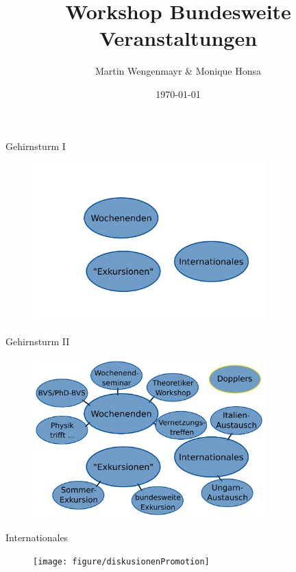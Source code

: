 \documentclass[
]{beamer}
\title[Bundesweites]{Workshop Bundesweite Veranstaltungen}
\author[Martin & Monique]{Martin Wengenmayr & Monique Honsa}
\date{\today}
\institute[]{A-Team Promotion}
\begin{document}
\maketitle

\begin{frame}{}
 \tableofcontents
\end{frame}

\begin{frame}{Gehirnsturm I}
  \begin{figure}
   \centering
   \includegraphics[width=0.80\textwidth]{figure/brainstormBundesweit_empty}
  \end{figure}
  \end{frame}

\begin{frame}{Gehirnsturm II}
\begin{figure}
 \centering
 \includegraphics[width=0.80\textwidth]{figure/brainstormBundesweit_full}
\end{figure}
\end{frame}

\begin{frame}{Internationales}
  \begin{figure}
   \centering
   \texttt{[image: figure/diskusionenPromotion]}
  \end{figure}
\end{frame}
\end{document}
